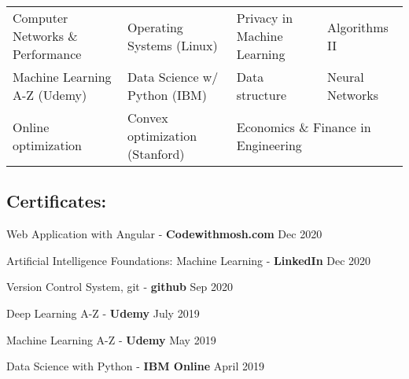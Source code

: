 \begin{tabular}{p{5.9cm}p{5.3cm}p{5cm}p{5cm}}
	Computer Networks \& Performance & Operating Systems (Linux) & Privacy in Machine Learning & Algorithms II\\
	Machine Learning A-Z (Udemy) & Data Science w/ Python (IBM) & Data structure & Neural Networks \\
	Online optimization & Convex optimization (Stanford) & \multicolumn{2}{l}{Economics \& Finance in Engineering}\\
\end{tabular}
\subsection{Certificates:}
\begin{zitemize}
	\item Web Application with Angular - \textbf{Codewithmosh.com} \hfill Dec 2020
	\item Artificial Intelligence Foundations: Machine Learning - \textbf{LinkedIn} \hfill Dec 2020
	\item Version Control System, git - \textbf{github} \hfill Sep 2020
	\item Deep Learning A-Z - \textbf{Udemy} \hfill July 2019
	\item Machine Learning A-Z - \textbf{Udemy} \hfill May 2019
	\item Data Science with Python - \textbf{IBM Online} \hfill April 2019
\end{zitemize}